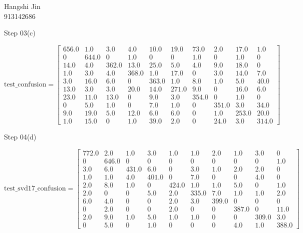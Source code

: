 \documentclass{article}
\begin{document}
\begin{flushright}Hangshi Jin \\913142686\end{flushright}
\begin{large}Step 03(c)\end{large}
   \[\text{test\_confusion}=\left[\begin{array}{cccccccccc} 656.0 & 1.0 & 3.0 & 4.0 & 10.0 & 19.0 & 73.0 & 2.0 & 17.0 & 1.0\\ 0 & 644.0 & 0 & 1.0 & 0 & 0 & 1.0 & 0 & 1.0 & 0\\ 14.0 & 4.0 & 362.0 & 13.0 & 25.0 & 5.0 & 4.0 & 9.0 & 18.0 & 0\\ 1.0 & 3.0 & 4.0 & 368.0 & 1.0 & 17.0 & 0 & 3.0 & 14.0 & 7.0\\ 3.0 & 16.0 & 6.0 & 0 & 363.0 & 1.0 & 8.0 & 1.0 & 5.0 & 40.0\\ 13.0 & 3.0 & 3.0 & 20.0 & 14.0 & 271.0 & 9.0 & 0 & 16.0 & 6.0\\ 23.0 & 11.0 & 13.0 & 0 & 9.0 & 3.0 & 354.0 & 0 & 1.0 & 0\\ 0 & 5.0 & 1.0 & 0 & 7.0 & 1.0 & 0 & 351.0 & 3.0 & 34.0\\ 9.0 & 19.0 & 5.0 & 12.0 & 6.0 & 6.0 & 0 & 1.0 & 253.0 & 20.0\\ 1.0 & 15.0 & 0 & 1.0 & 39.0 & 2.0 & 0 & 24.0 & 3.0 & 314.0 \end{array}\right]\]
\begin{large}Step 04(d)\end{large}
    \[\text{test\_svd17\_confusion}=\left[\begin{array}{cccccccccc} 772.0 & 2.0 & 1.0 & 3.0 & 1.0 & 1.0 & 2.0 & 1.0 & 3.0 & 0\\ 0 & 646.0 & 0 & 0 & 0 & 0 & 0 & 0 & 0 & 1.0\\ 3.0 & 6.0 & 431.0 & 6.0 & 0 & 3.0 & 1.0 & 2.0 & 2.0 & 0\\ 1.0 & 1.0 & 4.0 & 401.0 & 0 & 7.0 & 0 & 0 & 4.0 & 0\\ 2.0 & 8.0 & 1.0 & 0 & 424.0 & 1.0 & 1.0 & 5.0 & 0 & 1.0\\ 2.0 & 0 & 0 & 5.0 & 2.0 & 335.0 & 7.0 & 1.0 & 1.0 & 2.0\\ 6.0 & 4.0 & 0 & 0 & 2.0 & 3.0 & 399.0 & 0 & 0 & 0\\ 0 & 2.0 & 0 & 0 & 2.0 & 0 & 0 & 387.0 & 0 & 11.0\\ 2.0 & 9.0 & 1.0 & 5.0 & 1.0 & 1.0 & 0 & 0 & 309.0 & 3.0\\ 0 & 5.0 & 0 & 1.0 & 0 & 0 & 0 & 4.0 & 1.0 & 388.0 \end{array}\right]\]
\end{document}
